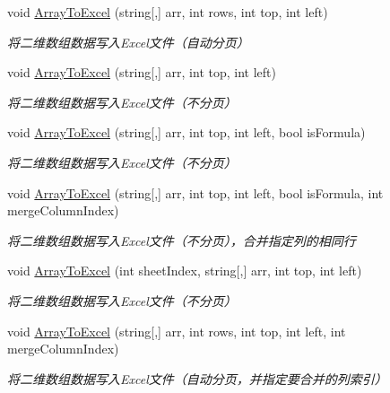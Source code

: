 \begin{DoxyCompactItemize}
void \hyperlink{class_x_c_l_net_tools_1_1_office_1_1_excel_handler_1_1_excel_helper_a030afbe0c22736247a4d56571d511d35}{Array\-To\-Excel} (string\mbox{[},\mbox{]} arr, int rows, int top, int left)
\begin{DoxyCompactList}\small\item\em 将二维数组数据写入\-Excel文件（自动分页） \end{DoxyCompactList}\item 
void \hyperlink{class_x_c_l_net_tools_1_1_office_1_1_excel_handler_1_1_excel_helper_a14572a6f3b54ae9c79abf8bceafdb899}{Array\-To\-Excel} (string\mbox{[},\mbox{]} arr, int top, int left)
\begin{DoxyCompactList}\small\item\em 将二维数组数据写入\-Excel文件（不分页） \end{DoxyCompactList}\item 
void \hyperlink{class_x_c_l_net_tools_1_1_office_1_1_excel_handler_1_1_excel_helper_af7ddc4bd7a68d157487f83a4b4525e96}{Array\-To\-Excel} (string\mbox{[},\mbox{]} arr, int top, int left, bool is\-Formula)
\begin{DoxyCompactList}\small\item\em 将二维数组数据写入\-Excel文件（不分页） \end{DoxyCompactList}\item 
void \hyperlink{class_x_c_l_net_tools_1_1_office_1_1_excel_handler_1_1_excel_helper_ae1ee324469dc2bc11d537cad8a18edab}{Array\-To\-Excel} (string\mbox{[},\mbox{]} arr, int top, int left, bool is\-Formula, int merge\-Column\-Index)
\begin{DoxyCompactList}\small\item\em 将二维数组数据写入\-Excel文件（不分页），合并指定列的相同行 \end{DoxyCompactList}\item 
void \hyperlink{class_x_c_l_net_tools_1_1_office_1_1_excel_handler_1_1_excel_helper_aad9f026e5f7ec6d4307f5755a44030f8}{Array\-To\-Excel} (int sheet\-Index, string\mbox{[},\mbox{]} arr, int top, int left)
\begin{DoxyCompactList}\small\item\em 将二维数组数据写入\-Excel文件（不分页） \end{DoxyCompactList}\item 
void \hyperlink{class_x_c_l_net_tools_1_1_office_1_1_excel_handler_1_1_excel_helper_a6d9aebcdcfc00873fa4ee3cff1b7db5f}{Array\-To\-Excel} (string\mbox{[},\mbox{]} arr, int rows, int top, int left, int merge\-Column\-Index)
\begin{DoxyCompactList}\small\item\em 将二维数组数据写入\-Excel文件（自动分页，并指定要合并的列索引） \end{DoxyCompactList}\item 

\end{DoxyCompactItemize}
